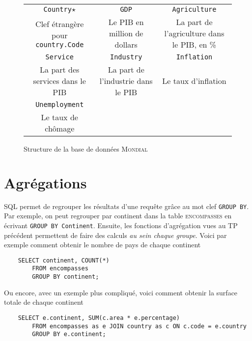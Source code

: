 \begin{figure}[h!]
{		\begin{tabular}{|ccc|}
			\hline
			\texttt{Country}$ \star $                 & \texttt{GDP}                       & \texttt{Agriculture}                        \\
			Clef étrangère pour \texttt{country.Code} & Le PIB en million de dollars       & La part de l'agriculture dans le PIB, en \% \\
			\hline
			\texttt{Service}                          & \texttt{Industry}                  & \texttt{Inflation}                          \\
			La part des services dans le PIB          & La part de l'industrie dans le PIB & Le taux d'inflation                         \\
			\hline
			\texttt{Unemployment}                     &                                    &                                             \\
			Le taux de chômage                        &                                    &                                             \\
			\hline
		\end{tabular}
	}
	\caption{Structure de la base de données \textsc{Mondial}}
	\label{fig:mondiale}
\end{figure}

\section{Agrégations}

SQL permet de regrouper les résultats d'une requête grâce au mot clef \texttt{GROUP BY}. Par exemple, on peut regrouper par continent dans la table \textsc{encompasses} en écrivant \texttt{GROUP BY Continent}. Ensuite, les fonctions d'agrégation vues au TP précédent permettent de faire des calculs \textit{au sein chaque groupe}. Voici par exemple comment obtenir le nombre de pays de chaque continent 

\begin{verbatim}
    SELECT continent, COUNT(*)
        FROM encompasses
        GROUP BY continent;
\end{verbatim}

Ou encore, avec un exemple plus compliqué, voici comment obtenir la surface totale de chaque continent 

\begin{verbatim}
    SELECT e.continent, SUM(c.area * e.percentage)
        FROM encompasses as e JOIN country as c ON c.code = e.country
        GROUP BY e.continent;
\end{verbatim}

